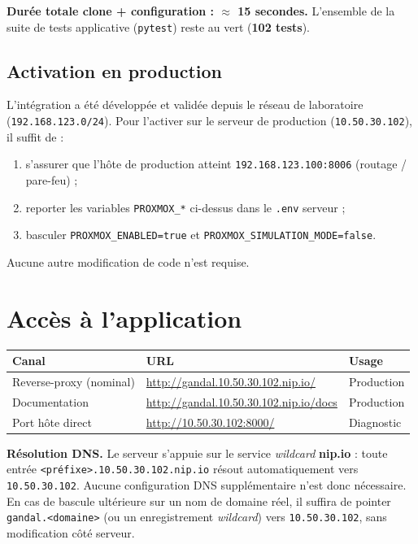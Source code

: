 \documentclass[11pt,a4paper]{article}
\newcommand{\code}[1]{\texttt{\small #1}}
\begin{document}
\noindent\textbf{Durée totale clone + configuration : $\approx$ 15 secondes.} L'ensemble de
la suite de tests applicative (\code{pytest}) reste au vert (\textbf{102 tests}).

\subsection{Activation en production}

L'intégration a été développée et validée depuis le réseau de laboratoire
(\code{192.168.123.0/24}). Pour l'activer sur le serveur de production
(\code{10.50.30.102}), il suffit de :
\begin{enumerate}
  \item s'assurer que l'hôte de production atteint \code{192.168.123.100:8006} (routage /
        pare-feu) ;
  \item reporter les variables \code{PROXMOX\_*} ci-dessus dans le \code{.env} serveur ;
  \item basculer \code{PROXMOX\_ENABLED=true} et \code{PROXMOX\_SIMULATION\_MODE=false}.
\end{enumerate}
\noindent Aucune autre modification de code n'est requise.

\section{Accès à l'application}

\begin{tabularx}{\linewidth}{@{}l X l@{}}
\toprule
\textbf{Canal} & \textbf{URL} & \textbf{Usage} \\
\midrule
Reverse-proxy (nominal) & \url{http://gandal.10.50.30.102.nip.io/} & Production \\
Documentation & \url{http://gandal.10.50.30.102.nip.io/docs} & Production \\
Port hôte direct & \url{http://10.50.30.102:8000/} & Diagnostic \\
\bottomrule
\end{tabularx}

\medskip
\noindent\textbf{Résolution DNS.} Le serveur s'appuie sur le service \emph{wildcard}
\textbf{nip.io} : toute entrée \code{<préfixe>.10.50.30.102.nip.io} résout
automatiquement vers \code{10.50.30.102}. Aucune configuration DNS supplémentaire n'est
donc nécessaire. En cas de bascule ultérieure sur un nom de domaine réel, il suffira de
pointer \code{gandal.<domaine>} (ou un enregistrement \emph{wildcard}) vers
\code{10.50.30.102}, sans modification côté serveur.
\end{document}
